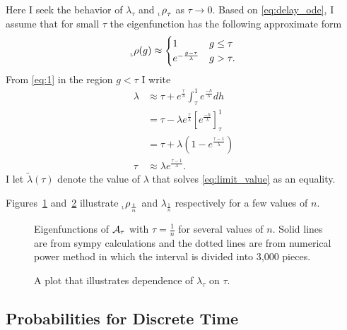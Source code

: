 \documentclass[12pt]{article} \usepackage{amsmath,amsfonts}
\newcommand{\Aop}{{\cal A}}
\newcommand{\leftfunction}{{_{_{\scalebox{.4}{L}}} \rho}}
\begin{document}
Here I seek the behavior of $\lambda_\tau$ and $\leftfunction_\tau$ as
$\tau \rightarrow 0$.  Based on \eqref{eq:delay_ode}, I assume that
for small $\tau$ the eigenfunction has the following approximate form
\begin{equation}
  \label{eq:limit_function}
  \leftfunction(g) \approx
  \begin{cases}
    1 & g \leq \tau \\
    e^{- \frac{g - \tau}{\lambda}} & g > \tau .
  \end{cases}
\end{equation}
From \eqref{eq:1} in the region $g<\tau$ I write
\begin{align}
  \lambda &\approx \tau + e^{\frac{\tau}{\lambda}} \int_\tau^1
  e^{\frac{-h}{\lambda}} dh \nonumber  \\
  &= \tau - \lambda e^{\frac{\tau}{\lambda}} \left[
    e^{\frac{-h}{\lambda}} \right]_\tau^1\nonumber  \\
  &= \tau + \lambda \left( 1 - e^{\frac{\tau -1 }{\lambda}} \right)
    \nonumber \\
  \label{eq:limit_value}
  \tau & \approx \lambda e^{\frac{\tau - 1}{\lambda}}.
\end{align}
I let $\tilde \lambda(\tau)$ denote the value of $\lambda$ that solves
\eqref{eq:limit_value} as an equality.

Figures~\ref{fig:eigenfunctions} and~\ref{fig:eigenvalues} illustrate
$\leftfunction_{\frac{1}{n}}$ and $\lambda_{\frac{1}{n}}$ respectively
for a few values of $n$.

\begin{figure*}
  \centering
  \caption{Eigenfunctions of $\Aop_\tau$ with $\tau=\frac{1}{n}$ for
    several values of $n$.  Solid lines are from sympy calculations
    and the dotted lines are from numerical power method in which the
    interval is divided into 3,000 pieces.}
  \label{fig:eigenfunctions}
\end{figure*}

\begin{figure*}
  \centering
  \caption{A plot that illustrates dependence of $\lambda_{\tau}$ on
    $\tau$.}
  \label{fig:eigenvalues}
\end{figure*}

\subsection{Probabilities for Discrete Time}
\label{sec:discrete_t}
\end{document}
